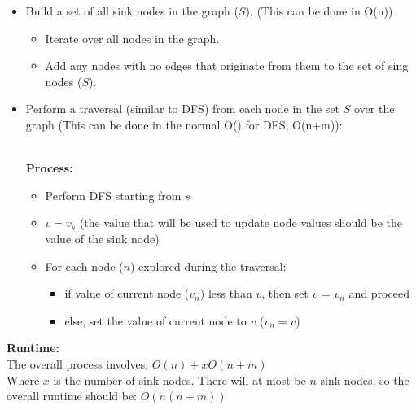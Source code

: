\documentclass[11pt]{article}
\begin{document}
\begin{itemize}

\item Build a set of all sink nodes in the graph ($S$). (This can be done in O(n))

\begin{itemize}
\item Iterate over all nodes in the graph.
\item Add any nodes with no edges that originate from them to the set of sing nodes ($S$).
\end{itemize}

\item Perform a traversal (similar to DFS) from each node in the set $S$ over the graph (This can be done in the normal O() for DFS, O(n+m)):

\begin{algorithm}
\\

\medskip
\textbf{Process:}
\begin{itemize}
\item Perform DFS starting from $s$
\item $v = v_s$ (the value that will be used to update node values should be the value of the sink node)
\item For each node ($n$) explored during the traversal:

\begin{itemize}
    \item if value of current node ($v_n$) less than $v$, then set $v$ = $v_n$ and proceed
    \item else, set the value of current node to $v$ ($v_n = v$)
    
\end{itemize}
\end{itemize}
\end{algorithm}
\end{itemize}

\noindent \textbf{Runtime:} \\
The overall process involves: $O(n) + xO(n + m)$\\
Where $x$ is the number of sink nodes. There will at most be $n$ sink nodes, so the overall runtime should be: $O(n(n+m))$\\
\end{document}
